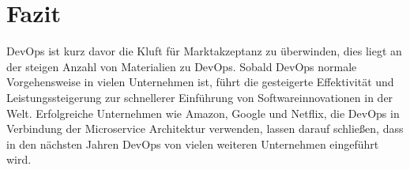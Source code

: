 \chapter{Fazit}
DevOps ist kurz davor die Kluft für Marktakzeptanz zu überwinden, dies liegt an der steigen Anzahl von Materialien zu DevOps. Sobald DevOps normale Vorgehensweise in vielen Unternehmen ist, führt die gesteigerte Effektivität und Leistungssteigerung zur schnellerer Einführung von Softwareinnovationen in der Welt. Erfolgreiche Unternehmen wie Amazon, Google und Netflix, die DevOps in Verbindung der  Microservice Architektur verwenden, lassen darauf schließen, dass in den nächsten Jahren DevOps von vielen weiteren Unternehmen eingeführt wird.